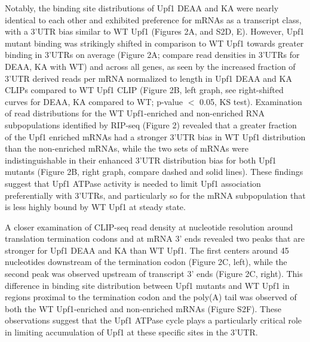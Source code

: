Notably, the binding site distributions of Upf1 DEAA and KA were nearly identical to each other and exhibited preference for mRNAs as a transcript class, with a 3’UTR bias similar to WT Upf1 (Figures 2A, and S2D, E). However, Upf1 mutant binding was strikingly shifted in comparison to WT Upf1 towards greater binding in 3’UTRs on average (Figure 2A; compare read densities in 3’UTRs for DEAA, KA with WT) and across all genes, as seen by the increased fraction of 3’UTR derived reads per mRNA normalized to length in Upf1 DEAA and KA CLIPs compared to WT Upf1 CLIP (Figure 2B, left graph, see right-shifted curves for DEAA, KA compared to WT; p-value $<$ 0.05, KS test). Examination of read distributions for the WT Upf1-enriched and non-enriched RNA subpopulations identified by RIP-seq (Figure 2) revealed that a greater fraction of the Upf1 enriched mRNAs had a stronger 3’UTR bias in WT Upf1 distribution than the non-enriched mRNAs, while the two sets of mRNAs were indistinguishable in their enhanced 3’UTR distribution bias for both Upf1 mutants (Figure 2B, right graph, compare dashed and solid lines). These findings suggest that Upf1 ATPase activity is needed to limit Upf1 association preferentially with 3’UTRs, and particularly so for the mRNA subpopulation that is less highly bound by WT Upf1 at steady state.

A closer examination of CLIP-seq read density at nucleotide resolution around translation termination codons and at mRNA 3’ ends revealed two peaks that are stronger for Upf1 DEAA and KA than WT Upf1. The first centers around 45 nucleotides downstream of the termination codon (Figure 2C, left), while the second peak was observed upstream of transcript 3’ ends (Figure 2C, right). This difference in binding site distribution between Upf1 mutants and WT Upf1 in regions proximal to the termination codon and the poly(A) tail was observed of both the WT Upf1-enriched and non-enriched mRNAs (Figure S2F). These observations suggest that the Upf1 ATPase cycle plays a particularly critical role in limiting accumulation of Upf1 at these specific sites in the 3’UTR.

